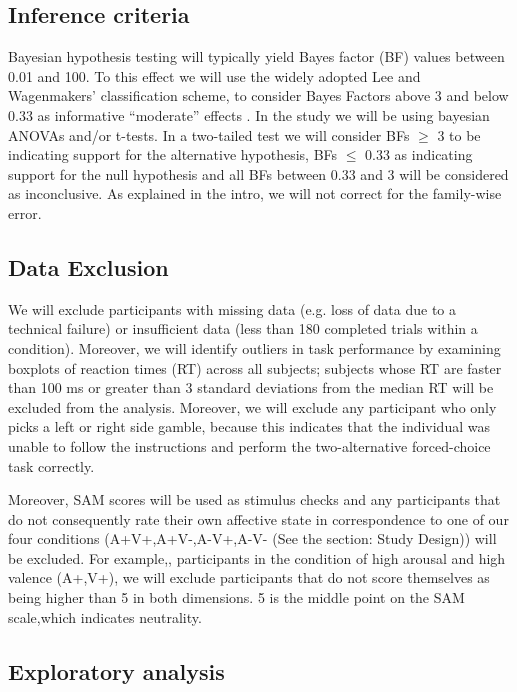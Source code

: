 \documentclass{article}
\begin{document}
    \subsection{Inference criteria}
    Bayesian hypothesis testing will typically yield Bayes factor (BF) values between 0.01 and 100. To this effect we will use the widely adopted Lee and Wagenmakers’ classification scheme, to consider Bayes Factors above 3 and below 0.33 as informative “moderate” effects  \cite{lee2014}. 
In the study we will be using bayesian ANOVAs and/or t-tests. In a two-tailed test we will consider BFs $\geq$ 3 to be indicating support for the alternative hypothesis, BFs $\leq$ 0.33 as indicating support for the null hypothesis and all BFs between 0.33 and 3 will be considered as inconclusive. 
As explained in the intro, we will not correct for the family-wise error.

    \subsection{Data Exclusion}

    We will exclude participants with missing data (e.g. loss of data due to a technical failure) or insufficient data (less than 180 completed trials within a condition). Moreover, we will identify outliers in task performance by examining boxplots of reaction times (RT) across all subjects; subjects whose RT are faster than 100 ms or greater than 3 standard deviations from the median RT will be excluded from the analysis. Moreover, we will exclude any participant who only picks a left or right side gamble, because this indicates that the individual was unable to follow the instructions and perform the two-alternative forced-choice task correctly.

Moreover, SAM scores will be used as stimulus checks and any participants that do not consequently rate their own affective state in correspondence to one of our four conditions (A+V+,A+V-,A-V+,A-V- (See the section: Study Design)) will be excluded. For example,, participants in the condition of high arousal and high valence (A+,V+), we will exclude participants that do not score themselves as being higher than 5 in both dimensions. 5 is the middle point on the SAM scale,which indicates neutrality.

\subsection{Exploratory analysis}
\end{document}

